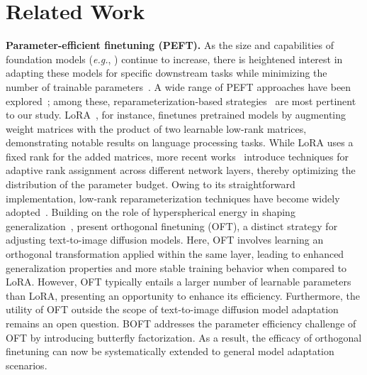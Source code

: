 \section{Related Work}

\textbf{Parameter-efficient finetuning (PEFT).} As the size and capabilities of foundation models (\emph{e.g.}, \cite{brown2020language,radford2021learning,rombach2022high,kirillov2023segment}) continue to increase, there is heightened interest in adapting these models for specific downstream tasks while minimizing the number of trainable parameters~\cite{treviso2023efficient,ding2023parameter,lialin2023scaling}. A wide range of PEFT approaches have been explored~\cite{houlsby2019parameter,aghajanyan2020intrinsic,hulora2022,edalati2022krona,wang2022adamix,gheini2021cross,zaken2022bitfit,guo2020parameter,sung2021training,ansell2022composable,lester2021power,li2021prefix,vu2022spot,he2021towards,mao2021unipelt,karimi2021compacter,liu2022few,sung2022lst,chen2022parameter,jia2022visual,chen2022adaptformer,zhang2022neural,jie2023fact,lian2022scaling,luo2023towards}; among these, reparameterization-based strategies~\cite{aghajanyan2020intrinsic,hulora2022,edalati2022krona} are most pertinent to our study. LoRA~\cite{hulora2022}, for instance, finetunes pretrained models by augmenting weight matrices with the product of two learnable low-rank matrices, demonstrating notable results on language processing tasks. While LoRA uses a fixed rank for the added matrices, more recent works~\cite{zhang2022adaptive,valipour2022dylora,zhang2023increlora} introduce techniques for adaptive rank assignment across different network layers, thereby optimizing the distribution of the parameter budget. Owing to its straightforward implementation, low-rank reparameterization techniques have become widely adopted~\cite{dettmers2023qlora,zi2023delta,chavan2023one}. Building on the role of hyperspherical energy in shaping generalization~\cite{liu2018learning,liu2021orthogonal}, \cite{qiu2023controlling} present orthogonal finetuning (OFT), a distinct strategy for adjusting text-to-image diffusion models. Here, OFT involves learning an orthogonal transformation applied within the same layer, leading to enhanced generalization properties and more stable training behavior when compared to LoRA. However, OFT typically entails a larger number of learnable parameters than LoRA, presenting an opportunity to enhance its efficiency. Furthermore, the utility of OFT outside the scope of text-to-image diffusion model adaptation~\cite{qiu2023controlling} remains an open question. BOFT addresses the parameter efficiency challenge of OFT by introducing butterfly factorization. As a result, the efficacy of orthogonal finetuning can now be systematically extended to general model adaptation scenarios.


